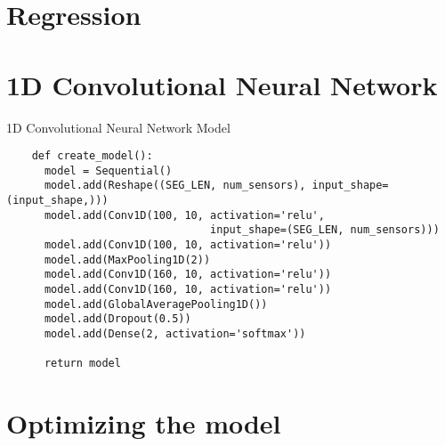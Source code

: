 \section{Regression}

\section{1D Convolutional Neural Network}

\begin{code}
  \caption{1D Convolutional Neural Network Model}
  \label{code:1d_conv_net}
  
  \begin{verbatim}
    def create_model():
      model = Sequential()
      model.add(Reshape((SEG_LEN, num_sensors), input_shape=(input_shape,)))
      model.add(Conv1D(100, 10, activation='relu', 
                                input_shape=(SEG_LEN, num_sensors)))
      model.add(Conv1D(100, 10, activation='relu'))
      model.add(MaxPooling1D(2))
      model.add(Conv1D(160, 10, activation='relu'))
      model.add(Conv1D(160, 10, activation='relu'))
      model.add(GlobalAveragePooling1D())
      model.add(Dropout(0.5))
      model.add(Dense(2, activation='softmax'))

      return model
  \end{verbatim}
\end{code}




\section{Optimizing the model}
